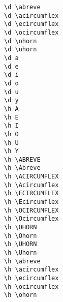 \begin{multicols}{2}
\X{\d \abreve} \verb|\d \abreve| \\
\X{\d \acircumflex} \verb|\d \acircumflex| \\
\X{\d \ecircumflex} \verb|\d \ecircumflex| \\
\X{\d \ocircumflex} \verb|\d \ocircumflex| \\
\X{\d \ohorn} \verb|\d \ohorn| \\
\X{\d \uhorn} \verb|\d \uhorn| \\
 \verb|\d a| \\
 \verb|\d e| \\
 \verb|\d i| \\
 \verb|\d o| \\
 \verb|\d u| \\
 \verb|\d y| \\
 \verb|\h A| \\
 \verb|\h E| \\
 \verb|\h I| \\
 \verb|\h O| \\
 \verb|\h U| \\
 \verb|\h Y| \\
\X{\h \ABREVE} \verb|\h \ABREVE| \\
\X{\h \Abreve} \verb|\h \Abreve| \\
\X{\h \ACIRCUMFLEX} \verb|\h \ACIRCUMFLEX| \\
\X{\h \Acircumflex} \verb|\h \Acircumflex| \\
\X{\h \ECIRCUMFLEX} \verb|\h \ECIRCUMFLEX| \\
\X{\h \Ecircumflex} \verb|\h \Ecircumflex| \\
\X{\h \OCIRCUMFLEX} \verb|\h \OCIRCUMFLEX| \\
\X{\h \Ocircumflex} \verb|\h \Ocircumflex| \\
\X{\h \OHORN} \verb|\h \OHORN| \\
\X{\h \Ohorn} \verb|\h \Ohorn| \\
\X{\h \UHORN} \verb|\h \UHORN| \\
\X{\h \Uhorn} \verb|\h \Uhorn| \\
\X{\h \abreve} \verb|\h \abreve| \\
\X{\h \acircumflex} \verb|\h \acircumflex| \\
\X{\h \ecircumflex} \verb|\h \ecircumflex| \\
\X{\h \ocircumflex} \verb|\h \ocircumflex| \\
\X{\h \ohorn} \verb|\h \ohorn| \\

\end{multicols}
